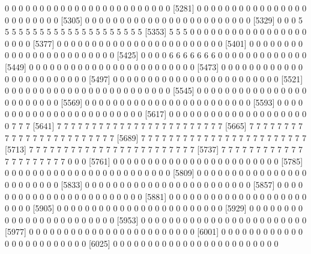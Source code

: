 \documentclass[11pt]{article}
\begin{document}
\begin{Schunk}
\begin{Soutput}
 [5257]  0  0  0  0  0  0  0  0  0  0  0  0  0  0  0  0  0  0  0  0  0  0  0  0
 [5281]  0  0  0  0  0  0  0  0  0  0  0  0  0  0  0  0  0  0  0  0  0  0  0  0
 [5305]  0  0  0  0  0  0  0  0  0  0  0  0  0  0  0  0  0  0  0  0  0  0  0  0
 [5329]  0  0  0  5  5  5  5  5  5  5  5  5  5  5  5  5  5  5  5  5  5  5  5  5
 [5353]  5  5  5  0  0  0  0  0  0  0  0  0  0  0  0  0  0  0  0  0  0  0  0  0
 [5377]  0  0  0  0  0  0  0  0  0  0  0  0  0  0  0  0  0  0  0  0  0  0  0  0
 [5401]  0  0  0  0  0  0  0  0  0  0  0  0  0  0  0  0  0  0  0  0  0  0  0  0
 [5425]  0  0  0  0  6  6  6  6  6  6  6  0  0  0  0  0  0  0  0  0  0  0  0  0
 [5449]  0  0  0  0  0  0  0  0  0  0  0  0  0  0  0  0  0  0  0  0  0  0  0  0
 [5473]  0  0  0  0  0  0  0  0  0  0  0  0  0  0  0  0  0  0  0  0  0  0  0  0
 [5497]  0  0  0  0  0  0  0  0  0  0  0  0  0  0  0  0  0  0  0  0  0  0  0  0
 [5521]  0  0  0  0  0  0  0  0  0  0  0  0  0  0  0  0  0  0  0  0  0  0  0  0
 [5545]  0  0  0  0  0  0  0  0  0  0  0  0  0  0  0  0  0  0  0  0  0  0  0  0
 [5569]  0  0  0  0  0  0  0  0  0  0  0  0  0  0  0  0  0  0  0  0  0  0  0  0
 [5593]  0  0  0  0  0  0  0  0  0  0  0  0  0  0  0  0  0  0  0  0  0  0  0  0
 [5617]  0  0  0  0  0  0  0  0  0  0  0  0  0  0  0  0  0  0  0  0  0  7  7  7
 [5641]  7  7  7  7  7  7  7  7  7  7  7  7  7  7  7  7  7  7  7  7  7  7  7  7
 [5665]  7  7  7  7  7  7  7  7  7  7  7  7  7  7  7  7  7  7  7  7  7  7  7  7
 [5689]  7  7  7  7  7  7  7  7  7  7  7  7  7  7  7  7  7  7  7  7  7  7  7  7
 [5713]  7  7  7  7  7  7  7  7  7  7  7  7  7  7  7  7  7  7  7  7  7  7  7  7
 [5737]  7  7  7  7  7  7  7  7  7  7  7  7  7  7  7  7  7  7  7  7  7  0  0  0
 [5761]  0  0  0  0  0  0  0  0  0  0  0  0  0  0  0  0  0  0  0  0  0  0  0  0
 [5785]  0  0  0  0  0  0  0  0  0  0  0  0  0  0  0  0  0  0  0  0  0  0  0  0
 [5809]  0  0  0  0  0  0  0  0  0  0  0  0  0  0  0  0  0  0  0  0  0  0  0  0
 [5833]  0  0  0  0  0  0  0  0  0  0  0  0  0  0  0  0  0  0  0  0  0  0  0  0
 [5857]  0  0  0  0  0  0  0  0  0  0  0  0  0  0  0  0  0  0  0  0  0  0  0  0
 [5881]  0  0  0  0  0  0  0  0  0  0  0  0  0  0  0  0  0  0  0  0  0  0  0  0
 [5905]  0  0  0  0  0  0  0  0  0  0  0  0  0  0  0  0  0  0  0  0  0  0  0  0
 [5929]  0  0  0  0  0  0  0  0  0  0  0  0  0  0  0  0  0  0  0  0  0  0  0  0
 [5953]  0  0  0  0  0  0  0  0  0  0  0  0  0  0  0  0  0  0  0  0  0  0  0  0
 [5977]  0  0  0  0  0  0  0  0  0  0  0  0  0  0  0  0  0  0  0  0  0  0  0  0
 [6001]  0  0  0  0  0  0  0  0  0  0  0  0  0  0  0  0  0  0  0  0  0  0  0  0
 [6025]  0  0  0  0  0  0  0  0  0  0  0  0  0  0  0  0  0  0  0  0  0  0  0  0

\end{Soutput}
\end{Schunk}
\end{document}
